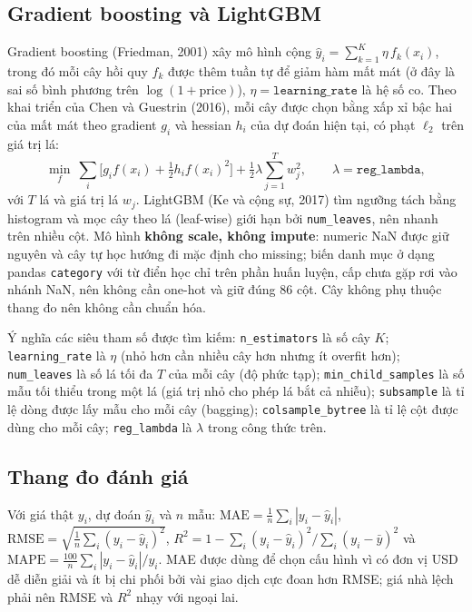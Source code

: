 \subsection{Gradient boosting và LightGBM}
\label{subsec:lightgbm}

Gradient boosting (Friedman, 2001) xây mô hình cộng $\hat y_i=\sum_{k=1}^{K}\eta\,f_k(x_i)$, trong đó mỗi cây
hồi quy $f_k$ được thêm tuần tự để giảm hàm mất mát (ở đây là sai số bình phương trên $\log(1+\text{price})$),
$\eta=\texttt{learning\_rate}$ là hệ số co. Theo khai triển của Chen và Guestrin (2016), mỗi cây được chọn bằng
xấp xỉ bậc hai của mất mát theo gradient $g_i$ và hessian $h_i$ của dự đoán hiện tại, có phạt $\ell_2$ trên giá
trị lá:
\begin{equation}
\min_{f}\ \sum_i\Big[g_i f(x_i)+\tfrac12 h_i f(x_i)^2\Big]+\tfrac12\lambda\sum_{j=1}^{T} w_j^2 ,
\qquad \lambda=\texttt{reg\_lambda},
\end{equation}
với $T$ lá và giá trị lá $w_j$. LightGBM (Ke và cộng sự, 2017) tìm ngưỡng tách bằng histogram và mọc cây theo
lá (leaf-wise) giới hạn bởi \texttt{num\_leaves}, nên nhanh trên nhiều cột. Mô hình \textbf{không scale, không
impute}: numeric NaN được giữ nguyên và cây tự học hướng đi mặc định cho missing; biến danh mục ở dạng pandas
\texttt{category} với từ điển học chỉ trên phần huấn luyện, cấp chưa gặp rơi vào nhánh NaN, nên không cần one-hot
và giữ đúng 86 cột. Cây không phụ thuộc thang đo nên không cần chuẩn hóa.

Ý nghĩa các siêu tham số được tìm kiếm: \texttt{n\_estimators} là số cây $K$; \texttt{learning\_rate} là $\eta$
(nhỏ hơn cần nhiều cây hơn nhưng ít overfit hơn); \texttt{num\_leaves} là số lá tối đa $T$ của mỗi cây (độ phức
tạp); \texttt{min\_child\_samples} là số mẫu tối thiểu trong một lá (giá trị nhỏ cho phép lá bắt cả nhiễu);
\texttt{subsample} là tỉ lệ dòng được lấy mẫu cho mỗi cây (bagging); \texttt{colsample\_bytree} là tỉ lệ cột được
dùng cho mỗi cây; \texttt{reg\_lambda} là $\lambda$ trong công thức trên.

\subsection{Thang đo đánh giá}

Với giá thật $y_i$, dự đoán $\hat y_i$ và $n$ mẫu:
$\text{MAE}=\frac1n\sum_i|y_i-\hat y_i|$,
$\text{RMSE}=\sqrt{\frac1n\sum_i(y_i-\hat y_i)^2}$,
$R^2=1-\sum_i(y_i-\hat y_i)^2\big/\sum_i(y_i-\bar y)^2$ và
$\text{MAPE}=\frac{100}{n}\sum_i|y_i-\hat y_i|/y_i$.
MAE được dùng để chọn cấu hình vì có đơn vị USD dễ diễn giải và ít bị chi phối bởi vài giao dịch cực đoan hơn
RMSE; giá nhà lệch phải nên RMSE và $R^2$ nhạy với ngoại lai.

